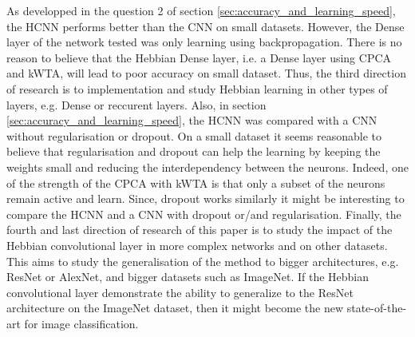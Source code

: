 \documentclass[11pt]{report}
\begin{document}
\newline
\newline
As developped in the question 2 of section \ref{sec:accuracy_and_learning_speed}, the HCNN performs better than the CNN on small datasets. However, the Dense layer of the network tested was only learning using backpropagation. There is no reason to believe that the Hebbian Dense layer, i.e. a Dense layer using CPCA and kWTA, will lead to poor accuracy on small dataset. Thus, the third direction of research is to implementation and study Hebbian learning in other types of layers, e.g. Dense or reccurent layers. Also, in section \ref{sec:accuracy_and_learning_speed}, the HCNN was compared with a CNN without regularisation or dropout. On a small dataset it seems reasonable to believe that regularisation and dropout can help the learning by keeping the weights small and reducing the interdependency between the neurons. Indeed, one of the strength of the CPCA with kWTA is that only a subset of the neurons remain active and learn. Since, dropout works similarly it might be interesting to compare the HCNN and a CNN with dropout or/and regularisation.
\newline
\newline
Finally, the fourth and last direction of research of this paper is to study the impact of the Hebbian convolutional layer in more complex networks and on other datasets. This aims to study the generalisation of the method to bigger architectures, e.g. ResNet or AlexNet, and bigger datasets such as ImageNet. If the Hebbian convolutional layer demonstrate the ability to generalize to the ResNet architecture on the ImageNet dataset, then it might become the new state-of-the-art for image classification.

\printbibliography
\end{document}
